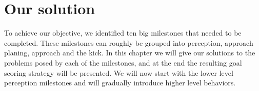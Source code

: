 \chapter{Our solution}

To achieve our objective, we identified ten big milestones that needed to be
completed. These milestones can roughly be grouped into perception, approach
planing, approach and the kick. In this chapter we will give our solutions to
the problems posed by each of the milestones, and at the end the resulting goal
scoring strategy will be presented. We will now start with the lower level
perception milestones and will gradually introduce higher level behaviors.
